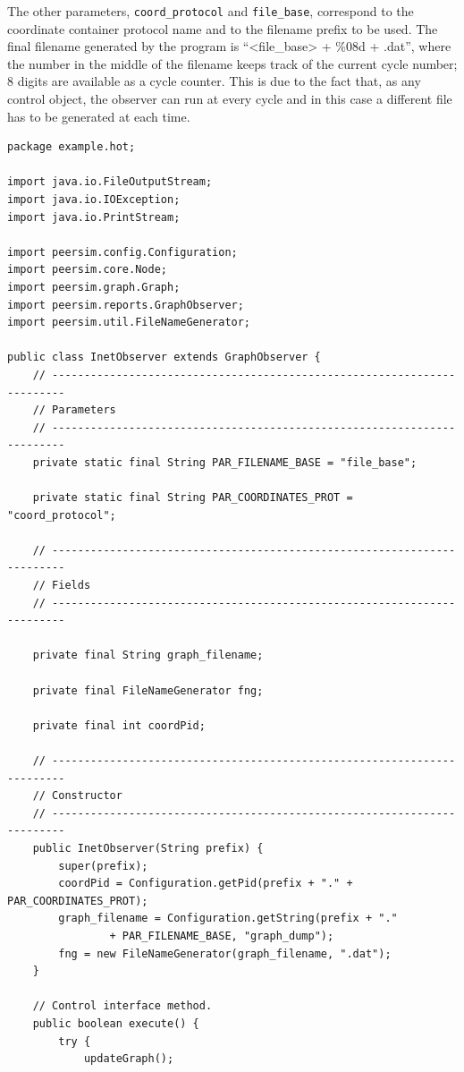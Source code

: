 \documentclass[a4paper,11pt]{article}
\begin{document}
The other parameters, \texttt{coord\_protocol} and \texttt{file\_base},
correspond to the coordinate container protocol
name and to the filename prefix to be used. 
The final filename generated by
the program is ``<file\_base> + \%08d + .dat'', 
where the number in the middle of the filename keeps track of the current
cycle number; 8 digits are available as a cycle counter. 
This is due to the fact that, as any control object, the
observer can run at every cycle and in this case a
different file has to be generated at each time. 

\footnotesize
\begin{verbatim}
package example.hot;

import java.io.FileOutputStream;
import java.io.IOException;
import java.io.PrintStream;

import peersim.config.Configuration;
import peersim.core.Node;
import peersim.graph.Graph;
import peersim.reports.GraphObserver;
import peersim.util.FileNameGenerator;

public class InetObserver extends GraphObserver {
    // ------------------------------------------------------------------------
    // Parameters
    // ------------------------------------------------------------------------
    private static final String PAR_FILENAME_BASE = "file_base";

    private static final String PAR_COORDINATES_PROT = "coord_protocol";

    // ------------------------------------------------------------------------
    // Fields
    // ------------------------------------------------------------------------

    private final String graph_filename;

    private final FileNameGenerator fng;

    private final int coordPid;

    // ------------------------------------------------------------------------
    // Constructor
    // ------------------------------------------------------------------------
    public InetObserver(String prefix) {
        super(prefix);
        coordPid = Configuration.getPid(prefix + "." + PAR_COORDINATES_PROT);
        graph_filename = Configuration.getString(prefix + "."
                + PAR_FILENAME_BASE, "graph_dump");
        fng = new FileNameGenerator(graph_filename, ".dat");
    }

    // Control interface method.
    public boolean execute() {
        try {
            updateGraph();


\end{verbatim}
\end{document}
